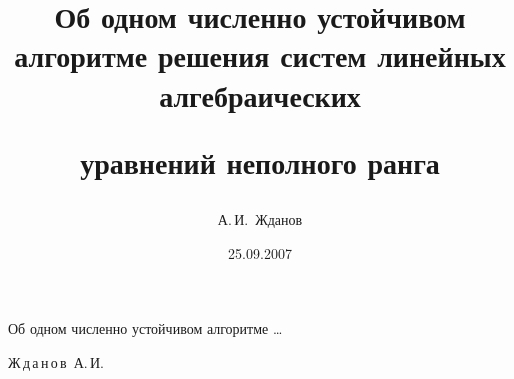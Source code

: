 
%



%



\renewcommand{\firstpage}{149} %

\renewcommand{\lastpage}{153} %











\title{Об одном численно устойчивом алгоритме решения систем линейных алгебраических

уравнений неполного ранга} %

      {Об одном численно устойчивом алгоритме \dots} %






\author{А.\,И.~Жданов}%

       {Ж\,д\,а\,н\,о\,в~А.\,И.}%




\date{25.09.2007} %



\address{Самарский государственный аэрокосмический университет \\ им. академика С.П.~Королева, г.\,Самара}








